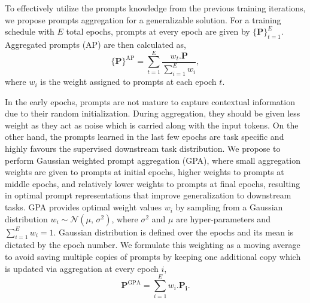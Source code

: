 \documentclass[10pt,twocolumn,letterpaper]{article}
\begin{document}
To effectively utilize the prompts knowledge from the previous training iterations, we propose prompts aggregation for a generalizable solution. For a training schedule with $E$ total epochs, prompts at every epoch are given by $\{{\bm{P}\}}_{t=1}^{E}$. Aggregated prompts (AP) are then calculated as,
\begin{equation}
\label{eq:p-tuning}
    \{\bm{P}\}^{\text{AP}} = \sum_{t=1}^{E}{\frac{w_{t} . \bm{P}}{\sum_{i=1}^{E}w_{i}}},
\end{equation}
where $w_{i}$ is the weight assigned to prompts at each epoch $t$. 

In the early epochs, prompts are not mature to capture contextual information due to their random initialization. During aggregation, they should be given less weight as they act as noise which is carried along with the input tokens. On the other hand, the prompts learned in the last few epochs are task specific and highly favours the supervised downstream task distribution. We propose to perform Gaussian weighted prompt aggregation (GPA), where small aggregation weights are given to prompts at initial epochs, higher weights to prompts at middle epochs, and relatively lower weights to prompts at final epochs, resulting in optimal prompt representations that improve generalization to downstream tasks. GPA provides optimal weight values $w_{i}$ by sampling from a %
Gaussian distribution $w_{i} \sim \mathcal{N}(\mu,\,\sigma^{2})$, where $\sigma^{2}$ and $\mu$ are hyper-parameters and $\sum_{i=1}^{E}w_{i}=1$. Gaussian distribution is defined over the epochs and its mean is dictated by the epoch number. We formulate this weighting as a moving average to avoid saving multiple copies of prompts by keeping one additional copy which is updated via aggregation at every epoch $i$,
\begin{equation}
\label{eq:moving_average}
    {\bm{P}}^{\text{GPA}} =  \sum_{i=1}^{E}w_{i} . \bm{P_{i}}.
\end{equation}
\end{document}
